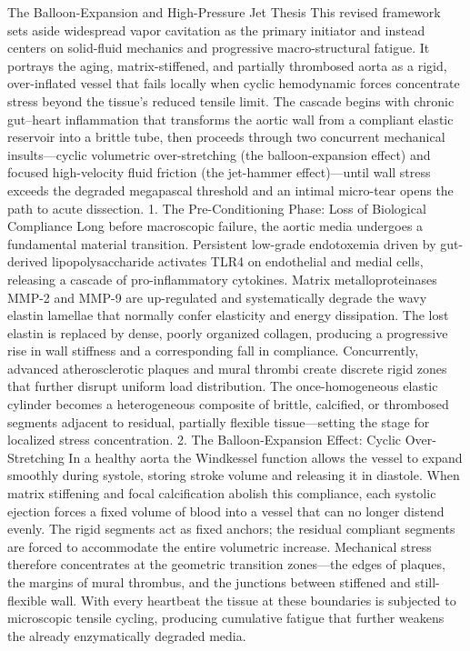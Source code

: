 The Balloon-Expansion and High-Pressure Jet Thesis
This revised framework sets aside widespread vapor cavitation as the primary initiator and instead centers on solid-fluid mechanics and progressive macro-structural fatigue. It portrays the aging, matrix-stiffened, and partially thrombosed aorta as a rigid, over-inflated vessel that fails locally when cyclic hemodynamic forces concentrate stress beyond the tissue’s reduced tensile limit. The cascade begins with chronic gut–heart inflammation that transforms the aortic wall from a compliant elastic reservoir into a brittle tube, then proceeds through two concurrent mechanical insults—cyclic volumetric over-stretching (the balloon-expansion effect) and focused high-velocity fluid friction (the jet-hammer effect)—until wall stress exceeds the degraded megapascal threshold and an intimal micro-tear opens the path to acute dissection.
1. The Pre-Conditioning Phase: Loss of Biological Compliance
Long before macroscopic failure, the aortic media undergoes a fundamental material transition. Persistent low-grade endotoxemia driven by gut-derived lipopolysaccharide activates TLR4 on endothelial and medial cells, releasing a cascade of pro-inflammatory cytokines. Matrix metalloproteinases MMP-2 and MMP-9 are up-regulated and systematically degrade the wavy elastin lamellae that normally confer elasticity and energy dissipation. The lost elastin is replaced by dense, poorly organized collagen, producing a progressive rise in wall stiffness and a corresponding fall in compliance. Concurrently, advanced atherosclerotic plaques and mural thrombi create discrete rigid zones that further disrupt uniform load distribution. The once-homogeneous elastic cylinder becomes a heterogeneous composite of brittle, calcified, or thrombosed segments adjacent to residual, partially flexible tissue—setting the stage for localized stress concentration.
2. The Balloon-Expansion Effect: Cyclic Over-Stretching
In a healthy aorta the Windkessel function allows the vessel to expand smoothly during systole, storing stroke volume and releasing it in diastole. When matrix stiffening and focal calcification abolish this compliance, each systolic ejection forces a fixed volume of blood into a vessel that can no longer distend evenly. The rigid segments act as fixed anchors; the residual compliant segments are forced to accommodate the entire volumetric increase. Mechanical stress therefore concentrates at the geometric transition zones—the edges of plaques, the margins of mural thrombus, and the junctions between stiffened and still-flexible wall. With every heartbeat the tissue at these boundaries is subjected to microscopic tensile cycling, producing cumulative fatigue that further weakens the already enzymatically degraded media.
